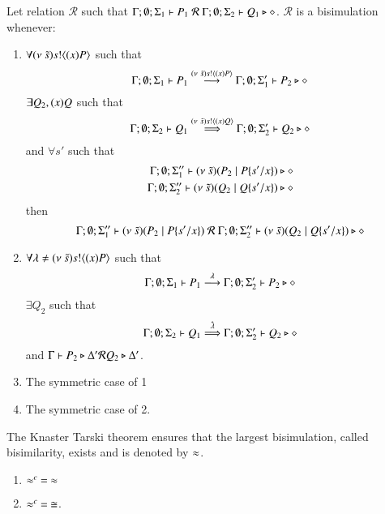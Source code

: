 \begin{definition}[Bisimulation]\rm
	Let relation $\mathcal{R}$ such that $\Gamma; \emptyset; \Sigma_1 \vdash P_1\ \mathcal{R}\ \Gamma; \emptyset; \Sigma_2 \vdash Q_1 \triangleright \diamond$.
	$\mathcal{R}$ is a bisimulation whenever:
	\begin{enumerate}
		\item	$\forall (\nu\ \tilde{s}) s ! \langle (x)P \rangle$ such that
			\[
				\Gamma; \emptyset; \Sigma_1 \vdash P_1 \stackrel{(\nu\ \tilde{s}) s ! \langle (x)P \rangle}{\longrightarrow} \Gamma; \emptyset; \Sigma_1' \vdash P_2 \triangleright \diamond
			\]
			$\exists Q_2, (x)Q$ such that
			\[
				\Gamma; \emptyset; \Sigma_2 \vdash Q_1 \stackrel{(\nu\ \tilde{s}) s ! \langle (x)Q \rangle}{\Longrightarrow} \Gamma; \emptyset; \Sigma_2' \vdash Q_2 \triangleright \diamond
			\]
			and $\forall s'$
			such that
			\begin{eqnarray*}
				\Gamma; \emptyset; \Sigma_1'' \vdash (\nu\ \tilde{s})(P_2 \;|\; P \{s'/x \}) \triangleright \diamond \\
				\Gamma; \emptyset; \Sigma_2'' \vdash (\nu\ \tilde{s})(Q_2 \;|\; Q \{s'/x \}) \triangleright \diamond
			\end{eqnarray*}
			then
			\[
				\Gamma; \emptyset; \Sigma_1'' \proves \newsp{\tilde{s}}{P_2 \Par P \subst{s'}{x}}\ \mathcal{R}\ 
				\Gamma; \emptyset; \Sigma_2'' \proves \newsp{\tilde{s}}{Q_2 \Par Q \subst{s'}{x}} \hastype \Proc
			\]

		\item	$\forall \lambda \not= (\nu\ \tilde{s}) s ! \langle (x)P \rangle$ such that
			\[
				\Gamma; \emptyset; \Sigma_1 \vdash P_1 \stackrel{\lambda}{\longrightarrow} \Gamma; \emptyset; \Sigma_2' \vdash P_2 \triangleright \diamond
			\]
			$\exists Q_2$ such that 
			\[
				\Gamma; \emptyset; \Sigma_2 \vdash Q_1 \stackrel{\hat{\lambda}}{\Longrightarrow} \Gamma; \emptyset; \Sigma_2' \vdash Q_2 \triangleright \diamond
			\]
			and
			$\Gamma \vdash P_2 \triangleright \Delta' \mathcal{R} Q_2 \triangleright \Delta'$.

		\item	The symmetric case of 1 
		\item	The symmetric case of 2.
	\end{enumerate}
	The Knaster Tarski theorem ensures that the largest bisimulation, called bisimilarity, exists and is denoted by $\approx$.
\end{definition}

\begin{theorem}
	\begin{enumerate}
		\item	$\approx^{c}\ =\ \approx$
		\item	$\approx^{c}\ =\ \cong$.
	\end{enumerate}
\end{theorem}

